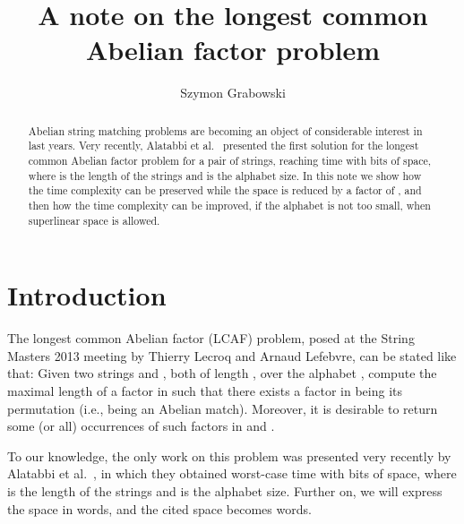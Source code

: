 \documentclass{llncs}
\begin{document}
\title{A note on the longest common Abelian factor problem}

\author{Szymon Grabowski}


\maketitle

\begin{abstract}
Abelian string matching problems are becoming an object of 
considerable interest in last years.
Very recently, Alatabbi et al.~\cite{AILR2015} presented the first solution 
for the longest common Abelian factor problem for a pair of strings, 
reaching  time with  bits of space, 
where  is the length of the strings and  is the alphabet size.
In this note we show how the time complexity can be preserved while 
the space is reduced by a factor of , and then how the time 
complexity can be improved, if the alphabet is not too small, 
when superlinear space is allowed.
\end{abstract}

\section{Introduction}
\noindent 
The longest common Abelian factor (LCAF) problem, posed at the 
String Masters 2013 meeting by Thierry Lecroq and Arnaud Lefebvre, 
can be stated like that:
Given two strings  and , both of length , over the alphabet 
, 
compute the maximal length of a factor in  such that there exists 
a factor in  being its permutation (i.e., being an Abelian match).
Moreover, it is desirable to return some (or all) occurrences of 
such factors in  and . 

To our knowledge, the only work on this problem was presented 
very recently by Alatabbi et al.~\cite{AILR2015}, in which 
they obtained  worst-case time 
with  bits of space, 
where  is the length of the strings and  is the alphabet size.
Further on, we will express the space in words, and the cited space 
becomes  words.
\end{document}
